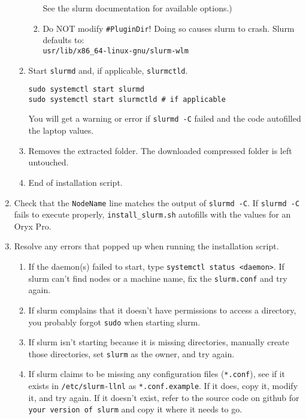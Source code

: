 \begin{enumerate}
\begin{enumerate}
\begin{enumerate}
		See the slurm documentation for available options.)

		\item Do NOT modify \texttt{\#PluginDir}! Doing so causes slurm to crash. Slurm defaults to: \\
		\texttt{usr/lib/x86\_64-linux-gnu/slurm-wlm}
		\end{enumerate} 

	\item Start \texttt{slurmd} and, if applicable, \texttt{slurmctld}.

	\texttt{sudo systemctl start slurmd} \\
	\texttt{sudo systemctl start slurmctld \quad \# if applicable}

	You will get a warning or error if \texttt{slurmd -C} failed and the code autofilled the laptop values.

	\item Removes the extracted folder. The downloaded compressed folder is left untouched.
	
	\item End of installation script.
	\end{enumerate}
	
\item Check that the \texttt{NodeName} line matches the output of \texttt{slurmd -C}. If \texttt{slurmd -C} fails to execute properly, \texttt{install\_slurm.sh} autofills with the values for an Oryx Pro.

\item Resolve any errors that popped up when running the installation script.

	\begin{enumerate}
	\item If the daemon(s) failed to start, type \texttt{systemctl status <daemon>}. If slurm can't find nodes or a machine name, fix the \texttt{slurm.conf} and try again. 

	\item If slurm complains that it doesn't have permissions to access a directory, you probably forgot \texttt{sudo} when starting slurm.

	\item If slurm isn't starting because it is missing directories, manually create those directories, set \texttt{slurm} as the owner, and try again.

	\item If slurm claims to be missing any configuration files (\texttt{*.conf}), see if it exists in \texttt{/etc/slurm-llnl} as \texttt{*.conf.example}. If it does, copy it, modify it, and try again. If it doesn't exist, refer to the source code on github for \texttt{your version of slurm} and copy it where it needs to go.


\end{enumerate}
\end{enumerate}
